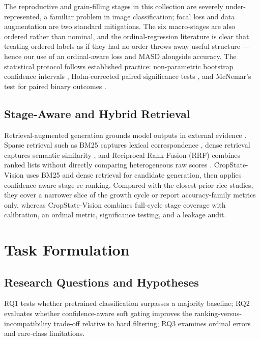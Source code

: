 \documentclass[conference]{IEEEtran}
\begin{document}
The reproductive and grain-filling stages in this collection are severely under-represented, a familiar problem in image classification; focal loss \cite{lin2017focal} and data augmentation \cite{shorten2019survey} are two standard mitigations. The six macro-stages are also ordered rather than nominal, and the ordinal-regression literature is clear that treating ordered labels as if they had no order throws away useful structure \cite{gutierrez2016ordinal}---hence our use of an ordinal-aware loss and MASD alongside accuracy. The statistical protocol follows established practice: non-parametric bootstrap confidence intervals \cite{efron1993bootstrap}, Holm-corrected paired significance tests \cite{holm1979sequential}, and McNemar's test for paired binary outcomes \cite{mcnemar1947note}.

\subsection{Stage-Aware and Hybrid Retrieval}

Retrieval-augmented generation grounds model outputs in external evidence \cite{lewis2020rag}. Sparse retrieval such as BM25 captures lexical correspondence \cite{robertson2009bm25}, dense retrieval captures semantic similarity \cite{karpukhin2020dpr}, and Reciprocal Rank Fusion (RRF) combines ranked lists without directly comparing heterogeneous raw scores \cite{cormack2009rrf}. CropState-Vision uses BM25 and dense retrieval for candidate generation, then applies confidence-aware stage re-ranking. Compared with the closest prior rice studies, they cover a narrower slice of the growth cycle or report accuracy-family metrics only, whereas CropState-Vision combines full-cycle stage coverage with calibration, an ordinal metric, significance testing, and a leakage audit.




\section{Task Formulation}

\subsection{Research Questions and Hypotheses}

RQ1 tests whether pretrained classification surpasses a majority baseline; RQ2 evaluates whether confidence-aware soft gating improves the ranking-versus-incompatibility trade-off relative to hard filtering; RQ3 examines ordinal errors and rare-class limitations.
\end{document}
